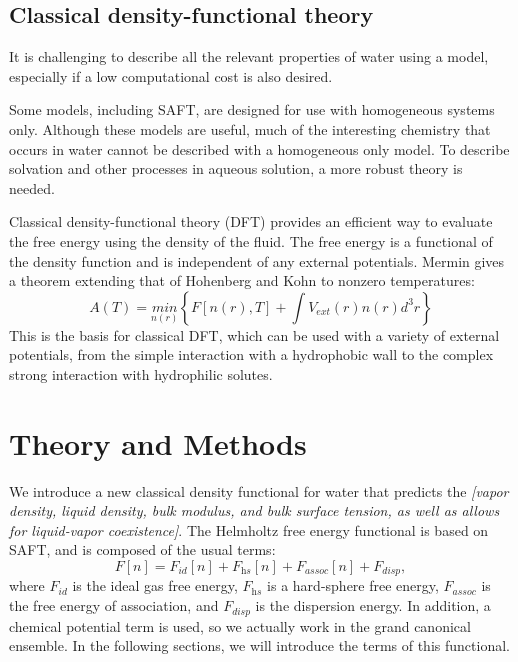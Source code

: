 \documentclass[letterpaper,twocolumn,amsmath,amssymb,prb]{revtex4-1}
\newcommand{\needsworklater}[1]{\emph{[#1]}}
\begin{document}
\subsection{Classical density-functional theory}

It is challenging to describe all the relevant properties of water using
a model, especially if a low computational cost is also desired.

Some models, including SAFT, are designed for use with
homogeneous systems only. Although these models are useful, much of the interesting
chemistry that occurs in water cannot be described with a homogeneous only model. To
describe solvation and other processes in aqueous solution, a more robust theory is 
needed.

Classical density-functional theory (DFT) provides an efficient way to evaluate the
free energy using the density of the fluid. The free energy is a functional of the 
density function and is independent of any external potentials\cite{ebner1976}. 
Mermin\cite{Mermin} gives a theorem extending that of Hohenberg and Kohn\cite{HK} 
to nonzero temperatures:
\begin{equation}
  A(T) = \underset{n(r)}{min}\left\{ F[n(r),T] + \int V_{ext}(r) n(r) d^3r\right\}
\end{equation}
This is the basis for classical DFT, which can be used with a variety of external potentials, 
from the simple interaction with a 
hydrophobic wall to the complex strong interaction with hydrophilic solutes.

\section{Theory and Methods}
We introduce a new classical density functional for water that
predicts the \needsworklater{vapor density, liquid density, bulk
  modulus, and bulk surface tension, as well as allows for
  liquid-vapor coexistence}.  The Helmholtz free energy functional is
based on SAFT, and is composed of the usual terms:
\begin{equation}
  F[n] = F_\textit{id}[n] + F_\textit{hs}[n] + F_\textit{assoc}[n] +
F_\textit{disp},
\end{equation}
where $F_\textit{id}$ is the ideal gas free energy, $F_\textit{hs}$ is
a hard-sphere free energy, $F_\textit{assoc}$ is the free energy of
association, and $F_\textit{disp}$ is the dispersion energy.  In
addition, a chemical potential term is used, so we actually work in
the grand canonical ensemble.  In the following sections, we will
introduce the terms of this functional.
\end{document}

